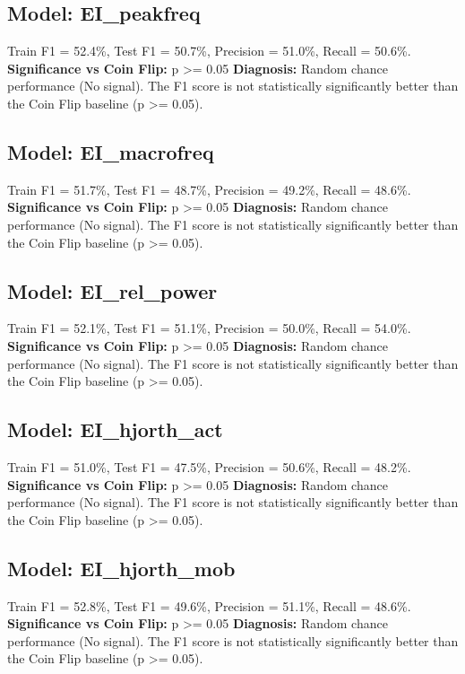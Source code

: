 \subsection*{Model: EI_peakfreq}
Train F1 = 52.4\%, Test F1 = 50.7\%, Precision = 51.0\%, Recall = 50.6\%.
\newline
\textbf{Significance vs Coin Flip:} p >= 0.05
\newline
\textbf{Diagnosis:} Random chance performance (No signal). The F1 score is not statistically significantly better than the Coin Flip baseline (p >= 0.05).

\subsection*{Model: EI_macrofreq}
Train F1 = 51.7\%, Test F1 = 48.7\%, Precision = 49.2\%, Recall = 48.6\%.
\newline
\textbf{Significance vs Coin Flip:} p >= 0.05
\newline
\textbf{Diagnosis:} Random chance performance (No signal). The F1 score is not statistically significantly better than the Coin Flip baseline (p >= 0.05).

\subsection*{Model: EI_rel_power}
Train F1 = 52.1\%, Test F1 = 51.1\%, Precision = 50.0\%, Recall = 54.0\%.
\newline
\textbf{Significance vs Coin Flip:} p >= 0.05
\newline
\textbf{Diagnosis:} Random chance performance (No signal). The F1 score is not statistically significantly better than the Coin Flip baseline (p >= 0.05).

\subsection*{Model: EI_hjorth_act}
Train F1 = 51.0\%, Test F1 = 47.5\%, Precision = 50.6\%, Recall = 48.2\%.
\newline
\textbf{Significance vs Coin Flip:} p >= 0.05
\newline
\textbf{Diagnosis:} Random chance performance (No signal). The F1 score is not statistically significantly better than the Coin Flip baseline (p >= 0.05).

\subsection*{Model: EI_hjorth_mob}
Train F1 = 52.8\%, Test F1 = 49.6\%, Precision = 51.1\%, Recall = 48.6\%.
\newline
\textbf{Significance vs Coin Flip:} p >= 0.05
\newline
\textbf{Diagnosis:} Random chance performance (No signal). The F1 score is not statistically significantly better than the Coin Flip baseline (p >= 0.05).

